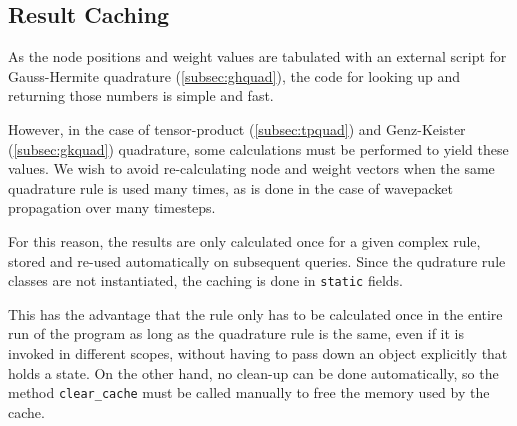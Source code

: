 \subsection{Result Caching}
\label{subsec:resultcaching}

As the node positions and weight values are tabulated with an external script
for Gauss-Hermite quadrature (\ref{subsec:ghquad}), the code for looking up and
returning those numbers is simple and fast.

However, in the case of tensor-product (\ref{subsec:tpquad}) and Genz-Keister
(\ref{subsec:gkquad}) quadrature, some calculations must be performed to yield
these values.
We wish to avoid re-calculating node and weight vectors when the same quadrature
rule is used many times, as is done in the case of wavepacket propagation over
many timesteps.

For this reason, the results are only calculated once for a given complex
rule, stored and re-used automatically on subsequent queries.
Since the qudrature rule classes are not instantiated, the caching is done in
\texttt{static} fields.

This has the advantage that the rule only has to be calculated once in the
entire run of the program as long as the quadrature rule is the same, even if it
is invoked in different scopes, without having to pass down an object explicitly
that holds a state.
On the other hand, no clean-up can be done automatically, so the method
\texttt{clear\_cache} must be called manually to free the memory used by the
cache.

